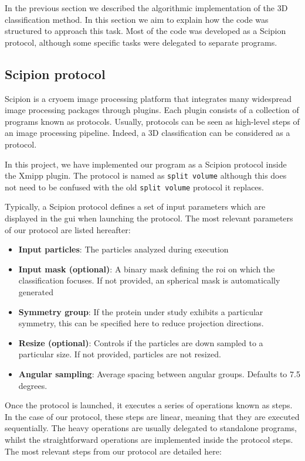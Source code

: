 \documentclass[../main.tex]{subfiles}
\begin{document}
In the previous section we described the algorithmic implementation of the 3D classification method. In this section we aim to explain how the code was structured to approach this task. Most of the code was developed as a Scipion protocol, although some specific tasks were delegated to separate programs.

\subsection{Scipion protocol}
Scipion is a \gls{cryoem} image processing platform that integrates many widespread image processing packages through plugins. Each plugin consists of a collection of programs known as protocols. Usually, protocols can be seen as high-level steps of an image processing pipeline. Indeed, a 3D classification can be considered as a protocol.

In this project, we have implemented our program as a Scipion protocol inside the Xmipp plugin. The protocol is named as \texttt{split volume} although this does not need to be confused with the old \texttt{split volume} protocol it replaces.

Typically, a Scipion protocol defines a set of input parameters which are displayed in the \gls{gui} when launching the protocol. The most relevant parameters of our protocol are listed hereafter:

\begin{itemize}
    \item \textbf{Input particles}: The particles analyzed during execution
    \item \textbf{Input mask (optional)}: A binary mask defining the \gls{roi} on which the classification focuses. If not provided, an spherical mask is automatically generated
    \item \textbf{Symmetry group}: If the protein under study exhibits a particular symmetry, this can be specified here to reduce projection directions.
    \item \textbf{Resize (optional)}: Controls if the particles are down sampled to a particular size. If not provided, particles are not resized.
    \item \textbf{Angular sampling}: Average spacing between angular groups. Defaults to 7.5 degrees.
\end{itemize}

Once the protocol is launched, it executes a series of operations known as steps. In the case of our protocol, these steps are linear, meaning that they are executed sequentially. The heavy operations are usually delegated to standalone programs, whilst the straightforward operations are implemented inside the protocol steps. The most relevant steps from our protocol are detailed here:
\end{document}
